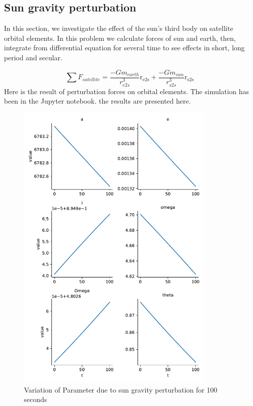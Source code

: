 \subsection{Sun gravity perturbation}
In this section, we investigate the effect of the sun's third body on satellite orbital elements. In this problem we calculate forces of sun and earth, then, integrate from differential equation for several time to see effects in short, long period and secular.

$$
\sum F_{satellite} = \dfrac{-Gm_{earth}}{r_{e2s}^3} \boldsymbol{\mathrm{r_{e2s}}} + \dfrac{-Gm_{sun}}{r_{s2s}^3} \boldsymbol{\mathrm{r_{s2s}}}
$$
Here is the result of perturbation forces on
orbital elements. The simulation has been in the Jupyter notebook. the results are presented here.

\begin{figure}[H]
    \centering
    \includegraphics[width=0.85\textwidth]{../Figure/Q2/orbital_elements_variation_sun_100}
    \caption{Variation of Parameter due to sun gravity perturbation for 100 seconds}
\end{figure}


